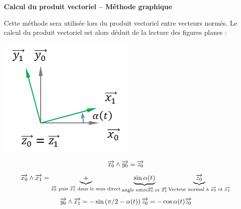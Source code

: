 \documentclass[10pt,oneside]{article}
\begin{document}
\begin{methode}
\textbf{Calcul du produit vectoriel -- Méthode graphique}

Cette méthode sera utilisée lors du produit vectoriel entre vecteurs normés. Le calcul du produit vectoriel est alors déduit de la lecture des figures planes : 

\begin{minipage}[c]{.3\linewidth}
\begin{center}
\includegraphics[width=.9\textwidth]{png/alpha}
\end{center}
\end{minipage} \hfill
\begin{minipage}[c]{.65\linewidth}
$$
\overrightarrow{x_0}\wedge\overrightarrow{y_0}=\overrightarrow{z_0}
$$
$$
\overrightarrow{x_0}\wedge\overrightarrow{x_1}=
\underbrace{+}_{\overrightarrow{x_0}  \text{ puis }\overrightarrow{x_1} \text{ dans le sens direct}}
\underbrace{\sin \alpha(t)}_{\text{angle entre} \overrightarrow{x_0} \text{ et }\overrightarrow{x_1}} 
\underbrace{\overrightarrow{z_0}}_{\text{Vecteur normal à } \overrightarrow{x_0} \text{ et }\overrightarrow{x_1}}
$$
$$
\overrightarrow{y_0}\wedge\overrightarrow{x_1}
=- \sin\left( \pi/2 - \alpha(t)\right) \overrightarrow{z_0}
=- \cos \alpha(t) \overrightarrow{z_0}
$$
\end{minipage}

\end{methode}
\end{document}
